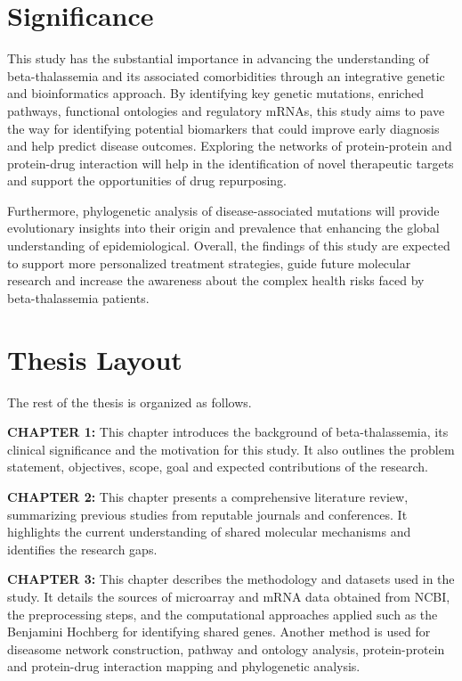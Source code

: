 \section{Significance}
\label{sec:sec03}

This study has the substantial importance in advancing the understanding of beta-thalassemia and its associated comorbidities through an integrative genetic and bioinformatics approach. By identifying key genetic mutations, enriched pathways, functional ontologies and regulatory mRNAs, this study aims to pave the way for identifying potential biomarkers that could improve early diagnosis and help predict disease outcomes. Exploring the networks of protein-protein and protein-drug interaction will help in the identification of novel therapeutic targets and support the opportunities of drug repurposing.

Furthermore, phylogenetic analysis of disease-associated mutations will provide evolutionary insights into their origin and prevalence that enhancing the global understanding of epidemiological. Overall, the findings of this study are expected to support more personalized treatment strategies, guide future molecular research and increase the awareness about the complex health risks faced by beta-thalassemia patients.

\section{Thesis Layout}
\label{sec:sec04}

The rest of the thesis is organized as follows.

\vspace{0.5cm}
\textbf{CHAPTER 1:}
This chapter introduces the background of beta-thalassemia, its clinical significance and the motivation for this study. It also outlines the problem statement, objectives, scope, goal and expected contributions of the research.

\vspace{0.2cm}

\textbf{CHAPTER 2:}
This chapter presents a comprehensive literature review, summarizing previous studies from reputable journals and conferences. It highlights the current understanding of shared molecular mechanisms and identifies the research gaps.

\vspace{0.2cm}

\textbf{CHAPTER 3:}
This chapter describes the methodology and datasets used in the study. It details the sources of microarray and mRNA data obtained from NCBI, the preprocessing steps, and the computational approaches applied such as the Benjamini Hochberg for identifying shared genes. Another method is used for diseasome network construction, pathway and ontology analysis, protein-protein and protein-drug interaction mapping and phylogenetic analysis.

